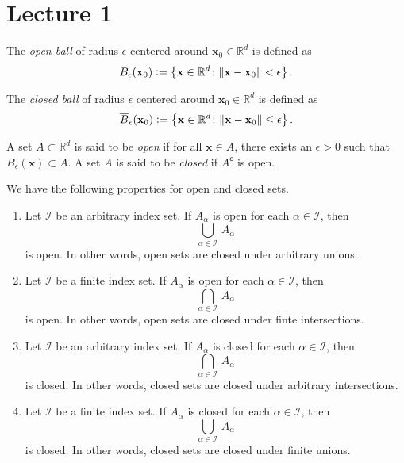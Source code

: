 \section{Lecture 1}
\medskip

\begin{defn}
    The \emph{open ball} of radius $\epsilon$ centered around $\mathbf{x}_0 \in \mathbb{R}^d$ is defined as
    \[
        B_{\epsilon}(\mathbf{x}_0) \vcentcolon= \left\{ \mathbf{x} \in \mathbb{R}^d \colon \norm{\mathbf{x} - \mathbf{x}_0} < \epsilon \right\}.
    \]
\end{defn}
\begin{defn}
    The \emph{closed ball} of radius $\epsilon$ centered around $\mathbf{x}_0 \in \mathbb{R}^d$ is defined as
    \[
        \overline{B}_{\epsilon}(\mathbf{x}_0) \vcentcolon= \left\{ \mathbf{x} \in \mathbb{R}^d \colon \norm{\mathbf{x} - \mathbf{x}_0} \leq \epsilon \right\}.
    \]
\end{defn}
\begin{defn}
    A set $A \subset \mathbb{R}^d$ is said to be \emph{open} if for all $\mathbf{x} 
    \in A$, there exists an $\epsilon > 0$ such that $B_{\epsilon}(\mathbf{x}) \subset A$. A set $A$ is said to be \emph{closed} if $A^{\mathsf{c}}$ is open.
\end{defn}

We have the following properties for open and closed sets.

\begin{enumerate}
    \item Let $\mathcal{I}$ be an arbitrary index set. If $A_{\alpha}$ is open for each $\alpha \in \mathcal{I}$, then 
    \[
        \bigcup_{\alpha \in \mathcal{I}} \, A_{\alpha}
    \]
    is open. In other words, open sets are closed under arbitrary unions.

    \item Let $\mathcal{I}$ be a finite index set. If $A_{\alpha}$ is open for each $\alpha \in \mathcal{I}$, then 
    \[
        \bigcap_{\alpha \in \mathcal{I}} \, A_{\alpha}
    \]
    is open. In other words, open sets are closed under finte intersections.

    \item Let $\mathcal{I}$ be an arbitrary index set. If $A_{\alpha}$ is closed for each $\alpha \in \mathcal{I}$, then 
    \[
        \bigcap_{\alpha \in \mathcal{I}} \, A_{\alpha}
    \]
    is closed. In other words, closed sets are closed under arbitrary intersections.

    \item Let $\mathcal{I}$ be a finite index set. If $A_{\alpha}$ is closed for each $\alpha \in \mathcal{I}$, then 
    \[
        \bigcup_{\alpha \in \mathcal{I}} \, A_{\alpha}
    \]
    is closed. In other words, closed sets are closed under finite unions.
\end{enumerate}

